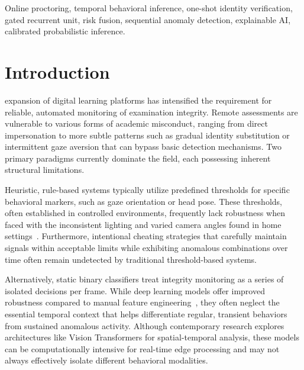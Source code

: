 \documentclass[journal]{IEEEtran}
\begin{document}
\begin{IEEEkeywords}
Online proctoring, temporal behavioral inference, one-shot identity verification, gated recurrent unit, risk fusion, sequential anomaly detection, explainable AI, calibrated probabilistic inference.
\end{IEEEkeywords}

\IEEEpeerreviewmaketitle

\section{Introduction}
\label{sec:intro}

 expansion of digital learning platforms has intensified the requirement for reliable, automated monitoring of examination integrity. Remote assessments are vulnerable to various forms of academic misconduct, ranging from direct impersonation to more subtle patterns such as gradual identity substitution or intermittent gaze aversion that can bypass basic detection mechanisms. Two primary paradigms currently dominate the field, each possessing inherent structural limitations.

Heuristic, rule-based systems typically utilize predefined thresholds for specific behavioral markers, such as gaze orientation or head pose. These thresholds, often established in controlled environments, frequently lack robustness when faced with the inconsistent lighting and varied camera angles found in home settings~\cite{Nigam2020, Atoum2017}. Furthermore, intentional cheating strategies that carefully maintain signals within acceptable limits while exhibiting anomalous combinations over time often remain undetected by traditional threshold-based systems.

Alternatively, static binary classifiers treat integrity monitoring as a series of isolated decisions per frame. While deep learning models offer improved robustness compared to manual feature engineering~\cite{Doughty2022, Ghizlane2019}, they often neglect the essential temporal context that helps differentiate regular, transient behaviors from sustained anomalous activity. Although contemporary research explores architectures like Vision Transformers for spatial-temporal analysis, these models can be computationally intensive for real-time edge processing and may not always effectively isolate different behavioral modalities.
\end{document}
